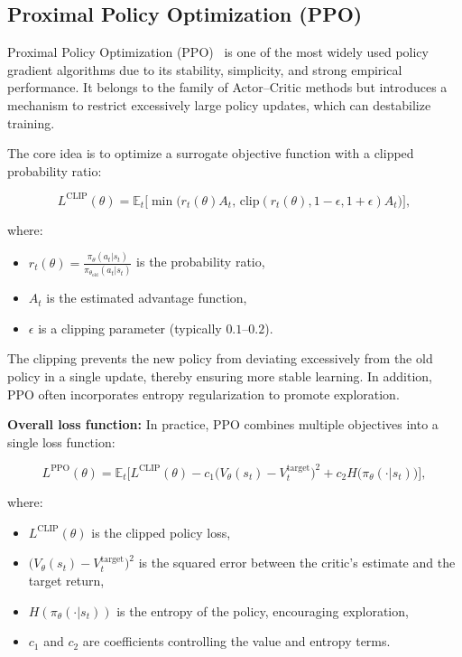 \documentclass[12pt,a4paper]{report}
\begin{document}
\subsection{Proximal Policy Optimization (PPO)}

Proximal Policy Optimization (PPO)~\cite{schulman2017proximal} is one of the most widely used policy gradient algorithms due to its stability, simplicity, and strong empirical performance. It belongs to the family of Actor–Critic methods but introduces a mechanism to restrict excessively large policy updates, which can destabilize training.

The core idea is to optimize a surrogate objective function with a clipped probability ratio:

\[
L^{\text{CLIP}}(\theta) = \mathbb{E}_t \Big[ 
    \min\big( r_t(\theta) A_t,\,
    \text{clip}(r_t(\theta), 1-\epsilon, 1+\epsilon) A_t \big)
\Big],
\]

where:
\begin{itemize}
    \item $r_t(\theta) = \frac{\pi_\theta(a_t|s_t)}{\pi_{\theta_\text{old}}(a_t|s_t)}$ is the probability ratio,
    \item $A_t$ is the estimated advantage function,
    \item $\epsilon$ is a clipping parameter (typically $0.1$–$0.2$).
\end{itemize}

The clipping prevents the new policy from deviating excessively from the old policy in a single update, thereby ensuring more stable learning. In addition, PPO often incorporates entropy regularization to promote exploration.

\bigskip
\textbf{Overall loss function:}  
In practice, PPO combines multiple objectives into a single loss function:

\[
L^{\text{PPO}}(\theta) = \mathbb{E}_t \Big[ 
    L^{\text{CLIP}}(\theta) 
    - c_1 \big( V_\theta(s_t) - V_t^{\text{target}} \big)^2 
    + c_2 H\big( \pi_\theta(\cdot|s_t) \big)
\Big],
\]

where:
\begin{itemize}
    \item $L^{\text{CLIP}}(\theta)$ is the clipped policy loss,
    \item $\big( V_\theta(s_t) - V_t^{\text{target}} \big)^2$ is the squared error between the critic’s estimate and the target return,
    \item $H(\pi_\theta(\cdot|s_t))$ is the entropy of the policy, encouraging exploration,
    \item $c_1$ and $c_2$ are coefficients controlling the value and entropy terms.
\end{itemize}
\end{document}
